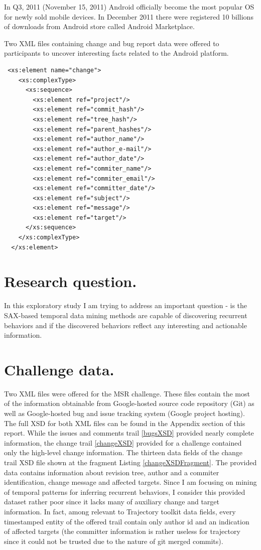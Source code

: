 \documentclass[a4paper,10pt]{article}
\numberwithin{equation}{subsection}
\begin{document}
In Q3, 2011 (November 15, 2011) Android officially become the most popular OS for newly sold mobile 
devices. In December 2011 there were registered 10 billions of downloads from Android store called
Android Marketplace. 

Two XML files containing change and bug report 
data were offered to participants to uncover interesting facts related to the Android platform.

\lstset{label=changeXSDFragment,caption=List of metadata provided by change trail XML (fragment) }
\begin{lstlisting}
 <xs:element name="change">
    <xs:complexType>
      <xs:sequence>
        <xs:element ref="project"/>
        <xs:element ref="commit_hash"/>
        <xs:element ref="tree_hash"/>
        <xs:element ref="parent_hashes"/>
        <xs:element ref="author_name"/>
        <xs:element ref="author_e-mail"/>
        <xs:element ref="author_date"/>
        <xs:element ref="commiter_name"/>
        <xs:element ref="commiter_email"/>
        <xs:element ref="committer_date"/>
        <xs:element ref="subject"/>
        <xs:element ref="message"/>
        <xs:element ref="target"/>
      </xs:sequence>
    </xs:complexType>
  </xs:element>
\end{lstlisting}

\section{Research question.}
In this exploratory study I am trying to address an important question - is the SAX-based temporal data
mining methods \cite{citeulike:1630245} \cite{citeulike:3025877} \cite{citeulike:3000416} 
are capable of discovering recurrent behaviors and if the discovered behaviors reflect 
any interesting and actionable information.

\section{Challenge data.}
Two XML files were offered for the MSR challenge. These files contain the most of the information
obtainable from Google-hosted source code repository (Git) as well as Google-hosted bug and issue
tracking system (Google project hosting). 
The full XSD for both XML files can be found in the Appendix section of this report.
While the issues and comments trail \ref{bugsXSD} provided nearly complete information,
the change trail \ref{changeXSD} provided for a challenge contained only the high-level change information.
The thirteen data fields of the change trail XSD file shown at the fragment Listing \ref{changeXSDFragment}. 
The provided data contains information about revision tree, author and a commiter identification, change
message and affected targets.
Since I am focusing on mining of temporal patterns for inferring recurrent behaviors, I consider 
this provided dataset rather poor since it lacks many of auxiliary change and target information. 
In fact, among relevant to Trajectory toolkit data fields, every timestamped entity of the offered trail
contain only author id and an indication of affected targets (the committer information
is rather useless for trajectory since it could not be trusted due to the nature of git merged commits).   
\end{document}
